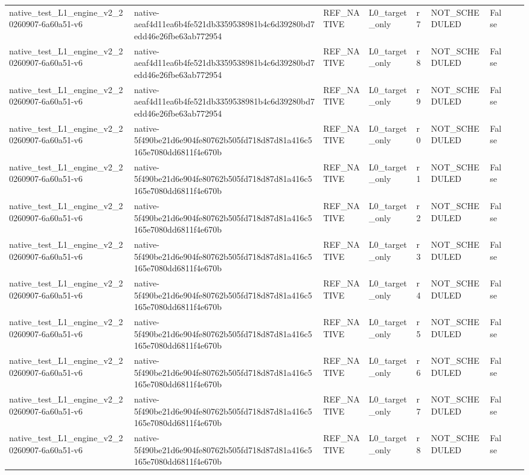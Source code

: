 \begin{tabular}{lllllllll}
native\_test\_L1\_engine\_v2\_20260907-6a60a51-v6 & native-aeaf4d11ea6b4fe521db3359538981b4c6d39280bd7edd46e26fbe63ab772954 & REF\_NATIVE & L0\_target\_only & r7 & NOT\_SCHEDULED & False &  &  \\
native\_test\_L1\_engine\_v2\_20260907-6a60a51-v6 & native-aeaf4d11ea6b4fe521db3359538981b4c6d39280bd7edd46e26fbe63ab772954 & REF\_NATIVE & L0\_target\_only & r8 & NOT\_SCHEDULED & False &  &  \\
native\_test\_L1\_engine\_v2\_20260907-6a60a51-v6 & native-aeaf4d11ea6b4fe521db3359538981b4c6d39280bd7edd46e26fbe63ab772954 & REF\_NATIVE & L0\_target\_only & r9 & NOT\_SCHEDULED & False &  &  \\
native\_test\_L1\_engine\_v2\_20260907-6a60a51-v6 & native-5f490be21d6e904fe80762b505fd718d87d81a416c5165e7080dd6811f4e670b & REF\_NATIVE & L0\_target\_only & r0 & NOT\_SCHEDULED & False &  &  \\
native\_test\_L1\_engine\_v2\_20260907-6a60a51-v6 & native-5f490be21d6e904fe80762b505fd718d87d81a416c5165e7080dd6811f4e670b & REF\_NATIVE & L0\_target\_only & r1 & NOT\_SCHEDULED & False &  &  \\
native\_test\_L1\_engine\_v2\_20260907-6a60a51-v6 & native-5f490be21d6e904fe80762b505fd718d87d81a416c5165e7080dd6811f4e670b & REF\_NATIVE & L0\_target\_only & r2 & NOT\_SCHEDULED & False &  &  \\
native\_test\_L1\_engine\_v2\_20260907-6a60a51-v6 & native-5f490be21d6e904fe80762b505fd718d87d81a416c5165e7080dd6811f4e670b & REF\_NATIVE & L0\_target\_only & r3 & NOT\_SCHEDULED & False &  &  \\
native\_test\_L1\_engine\_v2\_20260907-6a60a51-v6 & native-5f490be21d6e904fe80762b505fd718d87d81a416c5165e7080dd6811f4e670b & REF\_NATIVE & L0\_target\_only & r4 & NOT\_SCHEDULED & False &  &  \\
native\_test\_L1\_engine\_v2\_20260907-6a60a51-v6 & native-5f490be21d6e904fe80762b505fd718d87d81a416c5165e7080dd6811f4e670b & REF\_NATIVE & L0\_target\_only & r5 & NOT\_SCHEDULED & False &  &  \\
native\_test\_L1\_engine\_v2\_20260907-6a60a51-v6 & native-5f490be21d6e904fe80762b505fd718d87d81a416c5165e7080dd6811f4e670b & REF\_NATIVE & L0\_target\_only & r6 & NOT\_SCHEDULED & False &  &  \\
native\_test\_L1\_engine\_v2\_20260907-6a60a51-v6 & native-5f490be21d6e904fe80762b505fd718d87d81a416c5165e7080dd6811f4e670b & REF\_NATIVE & L0\_target\_only & r7 & NOT\_SCHEDULED & False &  &  \\
native\_test\_L1\_engine\_v2\_20260907-6a60a51-v6 & native-5f490be21d6e904fe80762b505fd718d87d81a416c5165e7080dd6811f4e670b & REF\_NATIVE & L0\_target\_only & r8 & NOT\_SCHEDULED & False &  &  \\

\end{tabular}
